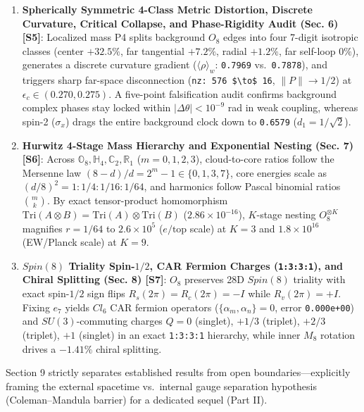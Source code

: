 \documentclass[
  a4paper,
]{article}
\begin{document}
\begin{enumerate}
\item
  \textbf{Spherically Symmetric 4-Class Metric Distortion, Discrete
  Curvature, Critical Collapse, and Phase-Rigidity Audit (Sec. 6)
  {[}S5{]}}: Localized mass P4 splits background \(O_8\) edges into four
  7-digit isotropic classes (center \(+32.5\%\), far tangential
  \(+7.2\%\), radial \(+1.2\%\), far self-loop \(0\%\)), generates a
  discrete curvature gradient (\(\langle\rho\rangle_w\): \texttt{0.7969}
  vs.~\texttt{0.7878}), and triggers sharp far-space disconnection
  (\texttt{nz:\ 576\ \$\textbackslash{}to\$\ 16}, \(\|P\| \to 1/2\)) at
  \(\epsilon_c \in (0.270, 0.275)\). A five-point falsification audit
  confirms background complex phases stay locked within
  \(|\Delta\theta| < 10^{-9}\) rad in weak coupling, whereas spin-2
  (\(\sigma_x\)) drags the entire background clock down to
  \texttt{0.6579} (\(d_1 = 1/\sqrt{2}\)).
\item
  \textbf{Hurwitz 4-Stage Mass Hierarchy and Exponential Nesting (Sec.
  7) {[}S6{]}}: Across
  \(\mathbb{O}_8, \mathbb{H}_4, \mathbb{C}_2, \mathbb{R}_1\)
  (\(m = 0,1,2,3\)), cloud-to-core ratios follow the Mersenne law
  \((8-d)/d = 2^m - 1 \in \{0,1,3,7\}\), core energies scale as
  \((d/8)^2 = 1:1/4:1/16:1/64\), and harmonics follow Pascal binomial
  ratios \(\binom{m}{k}\). By exact tensor-product homomorphism
  \(\mathrm{Tri}(A\otimes B) = \mathrm{Tri}(A)\otimes\mathrm{Tri}(B)\)
  (\(2.86\times 10^{-16}\)), \(K\)-stage nesting \(O_8^{\otimes K}\)
  magnifies \(r = 1/64\) to \(2.6\times 10^5\) (\(e/\text{top}\) scale)
  at \(K = 3\) and \(1.8\times 10^{16}\) (EW/Planck scale) at \(K = 9\).
\item
  \textbf{\(Spin(8)\) Triality Spin-\(1/2\), CAR Fermion Charges
  (\texttt{1:3:3:1}), and Chiral Splitting (Sec. 8) {[}S7{]}}: \(O_8\)
  preserves 28D \(Spin(8)\) triality with exact spin-\(1/2\) sign flips
  \(R_s(2\pi)=R_c(2\pi)=-I\) while \(R_v(2\pi)=+I\). Fixing \(e_7\)
  yields \(Cl_6\) CAR fermion operators (\(\{\alpha_m,\alpha_n\}=0\),
  error \texttt{0.000e+00}) and \(SU(3)\)-commuting charges \(Q = 0\)
  (singlet), \(+1/3\) (triplet), \(+2/3\) (triplet), \(+1\) (singlet) in
  an exact \texttt{1:3:3:1} hierarchy, while inner \(M_8\) rotation
  drives a \(-1.41\%\) chiral splitting.
\end{enumerate}

Section 9 strictly separates established results from open
boundaries---explicitly framing the external spacetime vs.~internal
gauge separation hypothesis (Coleman--Mandula barrier) for a dedicated
sequel (Part II).
\end{document}
